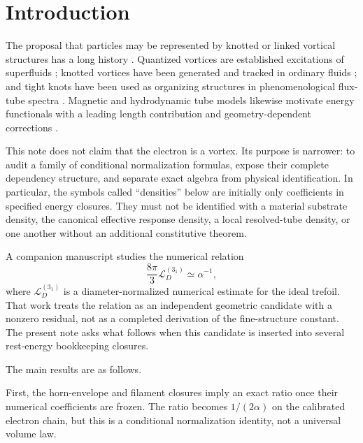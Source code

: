 \documentclass[aps,pre,preprint,notitlepage,nofootinbib,superscriptaddress]{revtex4-2}
\begin{document}
\maketitle

\section{Introduction}
\label{sec:intro}

The proposal that particles may be represented by knotted or linked vortical structures has a long history \cite{Thomson1867}.  Quantized vortices are established excitations of superfluids \cite{Onsager1949,Feynman1955,Vinen1961,Donnelly1991}; knotted vortices have been generated and tracked in ordinary fluids \cite{KlecknerIrvine2013}; and tight knots have been used as organizing structures in phenomenological flux-tube spectra \cite{BuniyKephart2005,BuniyEtAl2014}.  Magnetic and hydrodynamic tube models likewise motivate energy functionals with a leading length contribution and geometry-dependent corrections \cite{ChuiMoffatt1995,MaggioniRicca2009,Saffman1992}.

This note does not claim that the electron is a vortex.  Its purpose is narrower: to audit a family of conditional normalization formulas, expose their complete dependency structure, and separate exact algebra from physical identification.  In particular, the symbols called ``densities'' below are initially only coefficients in specified energy closures.  They must not be identified with a material substrate density, the canonical effective response density, a local resolved-tube density, or one another without an additional constitutive theorem.

A companion manuscript \cite{Iskandarani2026} studies the numerical relation
\[
\frac{8\pi}{3}\mathcal L_D^{(3_1)}
\simeq \alpha^{-1},
\]
where \(\mathcal L_D^{(3_1)}\) is a diameter-normalized numerical estimate for the ideal trefoil.  That work treats the relation as an independent geometric candidate with a nonzero residual, not as a completed derivation of the fine-structure constant.  The present note asks what follows when this candidate is inserted into several rest-energy bookkeeping closures.

The main results are as follows.

First, the horn-envelope and filament closures imply an exact ratio once their numerical coefficients are frozen.  The ratio becomes \(1/(2\alpha)\) on the calibrated electron chain, but this is a conditional normalization identity, not a universal volume law.
\end{document}
